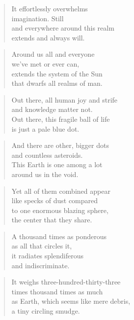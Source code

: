 \documentclass[10pt,a4paper]{article}
\begin{document}
\begin{paracol}{2}
\begin{verse}
It effortlessly overwhelms\\
imagination. Still\\
and everywhere around this realm\\
extends and always will.
\end{verse}

\begin{verse}
Around us all and everyone\\
we’ve met or ever can,\\
extends the system of the Sun\\
that dwarfs all realms of man.
\end{verse}

\begin{verse}
Out there, all human joy and strife\\
and knowledge matter not.\\
Out there, this fragile ball of life\\
is just a pale blue dot.
\end{verse}

\begin{verse}
And there are other, bigger dots\\
and countless asteroids.\\
This Earth is one among a lot\\
around us in the void.
\end{verse}

\begin{verse}
Yet all of them combined appear\\
like specks of dust compared\\
to one enormous blazing sphere,\\
the center that they share.
\end{verse}

\begin{verse}
A thousand times as ponderous\\
as all that circles it,\\
it radiates splendiferous\\
and indiscriminate. \\
\end{verse}

\begin{verse}
It weighs three-hundred-thirty-three\\
times thousand times as much\\
as Earth, which seems like mere debris,\\
a tiny circling smudge.
\end{verse}


\end{paracol}
\end{document}
